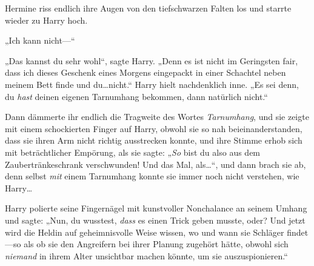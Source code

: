 Hermine riss endlich ihre Augen von den tiefschwarzen Falten los und starrte wieder zu Harry hoch.

„Ich kann nicht—“

„Das kannst du sehr wohl“, sagte Harry. „Denn es ist nicht im Geringsten fair, dass ich dieses Geschenk eines Morgens eingepackt in einer Schachtel neben meinem Bett finde und du…nicht.“ Harry hielt nachdenklich inne. „Es sei denn, du \emph{hast} deinen eigenen Tarnumhang bekommen, dann natürlich nicht.“

Dann dämmerte ihr endlich die Tragweite des Wortes \emph{Tarnumhang}, und sie zeigte mit einem schockierten Finger auf Harry, obwohl sie so nah beieinanderstanden, dass sie ihren Arm nicht richtig ausstrecken konnte, und ihre Stimme erhob sich mit beträchtlicher Empörung, als sie sagte: „\emph{So} bist du also aus dem Zaubertränkeschrank verschwunden! Und das Mal, als…“, und dann brach sie ab, denn selbst \emph{mit} einem Tarnumhang konnte sie immer noch nicht verstehen, wie Harry…

Harry polierte seine Fingernägel mit kunstvoller Nonchalance an seinem Umhang und sagte: „Nun, du wusstest, \emph{dass} es einen Trick geben musste, oder? Und jetzt wird die Heldin auf geheimnisvolle Weise wissen, wo und wann sie Schläger findet—so als ob sie den Angreifern bei ihrer Planung zugehört hätte, obwohl sich \emph{niemand} in ihrem Alter unsichtbar machen könnte, um sie auszuspionieren.“

